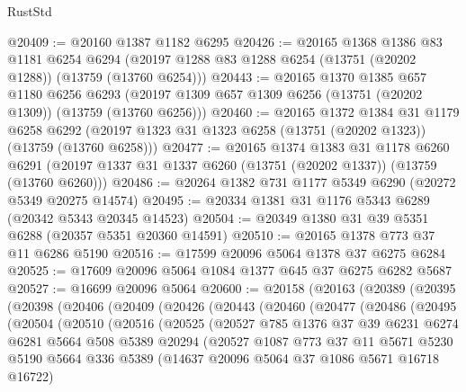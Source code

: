 \begin{lexlean}{RustStd}
\begin{coremodule}
@20409 := @20160 @1387 @1182 @6295
@20426 := @20165
    @1368
    @1386
    @83
    @1181
    @6254
    @6294
    (@20197 @1288 @83 @1288 @6254 (@13751 (@20202 @1288)) (@13759 (@13760 @6254)))
@20443 := @20165
    @1370
    @1385
    @657
    @1180
    @6256
    @6293
    (@20197 @1309 @657 @1309 @6256 (@13751 (@20202 @1309)) (@13759 (@13760 @6256)))
@20460 := @20165
    @1372
    @1384
    @31
    @1179
    @6258
    @6292
    (@20197 @1323 @31 @1323 @6258 (@13751 (@20202 @1323)) (@13759 (@13760 @6258)))
@20477 := @20165
    @1374
    @1383
    @31
    @1178
    @6260
    @6291
    (@20197 @1337 @31 @1337 @6260 (@13751 (@20202 @1337)) (@13759 (@13760 @6260)))
@20486 := @20264 @1382 @731 @1177 @5349 @6290 (@20272 @5349 @20275 @14574)
@20495 := @20334 @1381 @31 @1176 @5343 @6289 (@20342 @5343 @20345 @14523)
@20504 := @20349 @1380 @31 @39 @5351 @6288 (@20357 @5351 @20360 @14591)
@20510 := @20165 @1378 @773 @37 @11 @6286 @5190
@20516 := @17599 @20096 @5064 @1378 @37 @6275 @6284
@20525 := @17609 @20096 @5064 @1084 @1377 @645 @37 @6275 @6282 @5687
@20527 := @16699 @20096 @5064
@20600 := @20158
    (@20163
      (@20389
        (@20395
          (@20398
            (@20406
              (@20409
                (@20426
                  (@20443
                    (@20460
                      (@20477
                        (@20486
                          (@20495
                            (@20504
                              (@20510
                                (@20516
                                  (@20525
                                    (@20527
                                      @785
                                      @1376
                                      @37
                                      @39
                                      @6231
                                      @6274
                                      @6281
                                      @5664
                                      @508
                                      @5389
                                      @20294
                                      (@20527
                                        @1087
                                        @773
                                        @37
                                        @11
                                        @5671
                                        @5230
                                        @5190
                                        @5664
                                        @336
                                        @5389
                                        (@14637 @20096 @5064 @37 @1086 @5671 @16718 @16722)

\end{coremodule}
\end{lexlean}

